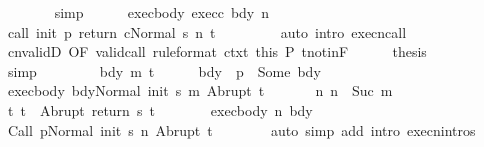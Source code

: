 \begin{isabellebody}
\ \ \ \ \ \ \isamarkupfalse%
\ simp\isanewline
\ \ \ \ \isamarkupfalse%
\ exec{\isacharunderscore}body\ exec{\isacharunderscore}c\ bdy\ n\isanewline
\ \ \ \ \isamarkupfalse%
\ {\isachardoublequoteopen}{\isasymGamma}{\isasymturnstile}{\isasymlangle}call\ init\ p\ return{\isacharprime}\ c{\isacharcomma}Normal\ s{\isasymrangle}\ {\isacharequal}n{\isasymRightarrow}\ t{\isachardoublequoteclose}\ \isanewline
\ \ \ \ \ \ \isamarkupfalse%
\ {\isacharparenleft}auto\ intro{\isacharcolon}\ execn{\isacharunderscore}call{\isacharparenright}\isanewline
\ \ \ \ \isamarkupfalse%
\ cnvalidD\ {\isacharbrackleft}OF\ valid{\isacharunderscore}call\ {\isacharbrackleft}rule{\isacharunderscore}format{\isacharbrackright}\ ctxt\ this{\isacharbrackright}\ P\ t{\isacharunderscore}notin{\isacharunderscore}F\isanewline
\ \ \ \ \isamarkupfalse%
\ {\isacharquery}thesis\isanewline
\ \ \ \ \ \ \isamarkupfalse%
\ simp\isanewline
\ \ \isamarkupfalse%
\isanewline
\ \ \ \ \isamarkupfalse%
\ bdy\ m\ t{\isacharprime}\isanewline
\ \ \ \ \isamarkupfalse%
\ bdy{\isacharcolon}\ {\isachardoublequoteopen}{\isasymGamma}\ p\ {\isacharequal}\ Some\ bdy{\isachardoublequoteclose}\isanewline
\ \ \ \ \isamarkupfalse%
\ exec{\isacharunderscore}body{\isacharcolon}\ {\isachardoublequoteopen}{\isasymGamma}{\isasymturnstile}{\isasymlangle}bdy{\isacharcomma}Normal\ {\isacharparenleft}init\ s{\isacharparenright}{\isasymrangle}\ {\isacharequal}m{\isasymRightarrow}\ Abrupt\ t{\isacharprime}{\isachardoublequoteclose}\ \isanewline
\ \ \ \ \isamarkupfalse%
\ n{\isacharcolon}\ {\isachardoublequoteopen}n\ {\isacharequal}\ Suc\ m{\isachardoublequoteclose}\isanewline
\ \ \ \ \isamarkupfalse%
\ t{\isacharcolon}\ {\isachardoublequoteopen}t\ {\isacharequal}\ Abrupt\ {\isacharparenleft}return\ s\ t{\isacharprime}{\isacharparenright}{\isachardoublequoteclose}\isanewline
\ \ \ \ \isamarkupfalse%
\ \isamarkupfalse%
\ exec{\isacharunderscore}body\ n\ bdy\isanewline
\ \ \ \ \isamarkupfalse%
\ {\isachardoublequoteopen}{\isasymGamma}{\isasymturnstile}{\isasymlangle}Call\ p{\isacharcomma}Normal\ {\isacharparenleft}init\ s{\isacharparenright}{\isasymrangle}\ {\isacharequal}n{\isasymRightarrow}\ Abrupt\ t{\isacharprime}{\isachardoublequoteclose}\isanewline
\ \ \ \ \ \ \isamarkupfalse%
\ {\isacharparenleft}auto\ simp\ add{\isacharcolon}\ intro{\isacharcolon}\ execn{\isachardot}intros{\isacharparenright}\isanewline

\end{isabellebody}
